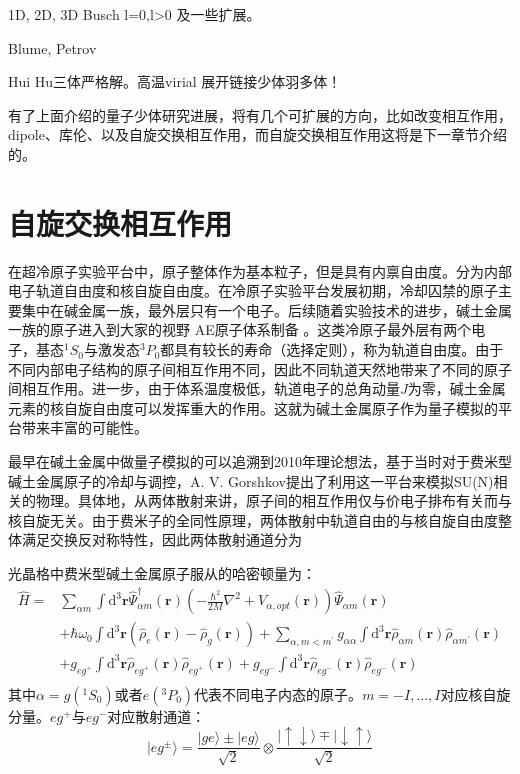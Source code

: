 1D, 2D, 3D Busch l=0,l>0 及一些扩展。







Blume, Petrov

Hui Hu三体严格解。高温virial 展开链接少体羽多体！


有了上面介绍的量子少体研究进展，将有几个可扩展的方向，比如改变相互作用，dipole、库伦、以及自旋交换相互作用，而自旋交换相互作用这将是下一章节介绍的。

\section{自旋交换相互作用}\label{sec:spin-exchange}
在超冷原子实验平台中，原子整体作为基本粒子，但是具有内禀自由度。分为内部电子轨道自由度和核自旋自由度。在冷原子实验平台发展初期，冷却囚禁的原子主要集中在碱金属一族，最外层只有一个电子。后续随着实验技术的进步，碱土金属一族的原子进入到大家的视野{\color{red} AE原子体系制备 }。这类冷原子最外层有两个电子，基态${}^1S_0$与激发态${}^3P_0$都具有较长的寿命（选择定则），称为轨道自由度。由于不同内部电子结构的原子间相互作用不同，因此不同轨道天然地带来了不同的原子间相互作用。进一步，由于体系温度极低，轨道电子的总角动量$J$为零，碱土金属元素的核自旋自由度可以发挥重大的作用。这就为碱土金属原子作为量子模拟的平台带来丰富的可能性。

最早在碱土金属中做量子模拟的可以追溯到2010年理论想法，基于当时对于费米型碱土金属原子的冷却与调控，A. V. Gorshkov提出了利用这一平台来模拟SU(N)相关的物理。具体地，从两体散射来讲，原子间的相互作用仅与价电子排布有关而与核自旋无关。由于费米子的全同性原理，两体散射中轨道自由的与核自旋自由度整体满足交换反对称特性，因此两体散射通道分为

光晶格中费米型碱土金属原子服从的哈密顿量为：
\begin{equation}
\begin{aligned}
\hat{H}=& \sum_{\alpha m} \int \mathrm{d}^{3} \mathbf{r} \hat{\Psi}_{\alpha m}^{\dagger}(\mathbf{r})\left(-\frac{\hbar^{2}}{2 M} \nabla^{2}+V_{\alpha,opt}(\mathbf{r})\right) \hat{\Psi}_{\alpha m}(\mathbf{r}) \\
&+\hbar \omega_{0} \int \mathrm{d}^{3} \mathbf{r}\left(\hat{\rho}_{e}(\mathbf{r})-\hat{\rho}_{g}(\mathbf{r})\right)+ \sum_{\alpha, m<m^{\prime}} g_{\alpha \alpha} \int \mathrm{d}^{3} \mathbf{r} \hat{\rho}_{\alpha m}(\mathbf{r}) \hat{\rho}_{\alpha m^{\prime}}(\mathbf{r})  \\
&+ g_{e g^+} \int \mathrm{d}^{3} \mathbf{r} \hat{\rho}_{eg^+}(\mathbf{r}) \hat{\rho}_{eg^+}(\mathbf{r})+g_{e g^-} \int \mathrm{d}^{3} \mathbf{r} \hat{\rho}_{eg^-}(\mathbf{r}) \hat{\rho}_{eg^-}(\mathbf{r})\\
\end{aligned}
\end{equation}
其中$\alpha=g({^1S_0})$或者$e({}^3P_0)$代表不同电子内态的原子。$m=-I,...,I$对应核自旋分量。$eg^+$与$eg^-$对应散射通道：
\begin{equation}
|eg^{\pm}\rangle = \frac{|ge\rangle\pm|eg\rangle}{\sqrt{2}}\otimes\frac{|\uparrow\downarrow\rangle\mp|\downarrow\uparrow \rangle}{\sqrt{2}}
\end{equation}

